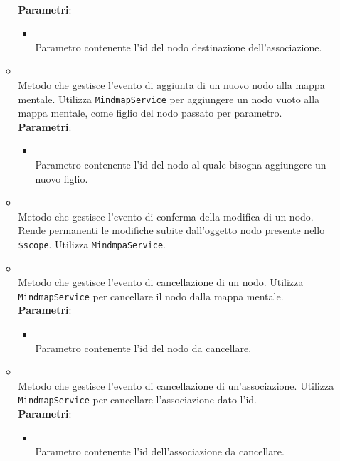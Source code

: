 \begin{itemize}
\begin{itemize}
\\ \textbf{Parametri}:
\begin{itemize}
\item {}
\\ Parametro contenente l'id del nodo destinazione dell'associazione.
\end{itemize}
\item {}
\\ Metodo che gestisce l'evento di aggiunta di un nuovo nodo alla mappa mentale. Utilizza \texttt{MindmapService} per aggiungere un nodo vuoto alla mappa mentale, come figlio del nodo passato per parametro.
\\ \textbf{Parametri}:
\begin{itemize}
\item {}
\\ Parametro contenente l'id del nodo al quale bisogna aggiungere un nuovo figlio.
\end{itemize}
\item {}
\\ Metodo che gestisce l'evento di conferma della modifica di un nodo. Rende permanenti le modifiche subite dall'oggetto nodo presente nello \texttt{\$scope}. Utilizza \texttt{MindmpaService}.
\item {}
\\ Metodo che gestisce l'evento di cancellazione di un nodo. Utilizza \texttt{MindmapService} per cancellare il nodo dalla mappa mentale.
\\ \textbf{Parametri}:
\begin{itemize}
\item {}
\\ Parametro contenente l'id del nodo da cancellare.
\end{itemize}
\item {}
\\ Metodo che gestisce l'evento di cancellazione di un'associazione. Utilizza \texttt{MindmapService} per cancellare l'associazione dato l'id.
\\ \textbf{Parametri}:
\begin{itemize}
\item {}
\\ Parametro contenente l'id dell'associazione da cancellare.

\end{itemize}
\end{itemize}
\end{itemize}
